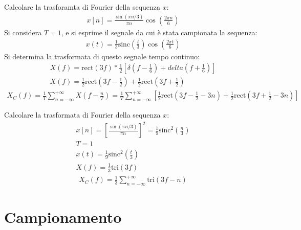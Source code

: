 \documentclass{article}
\begin{document}
Calcolare la trasforamta di Fourier della sequenza $x$:
\begin{gather*}
    x[n]=\displaystyle\frac{\sin(\pi n/3)}{\pi n}\cos\left(\frac{2\pi n}{6}\right)
\end{gather*}
Si considera $T=1$, e si esprime il segnale da cui è stata campionata la sequenza:
\begin{gather*}
    x(t)=\frac{1}{3}\mbox{sinc}\left(\frac{t}{3}\right)\cos\left(\frac{2\pi t}{6}\right)
\end{gather*}
Si determina la trasformata di questo segnale tempo continuo:
\begin{gather*}
    X(f)=\displaystyle\mbox{rect}(3f)*\frac{1}{2}\left[\delta\left(f-\frac{1}{6}\right)+delta\left(f+\frac{1}{6}\right)\right]\\
    X(f)=\displaystyle\frac{1}{2}\mbox{rect}\left(3f-\frac{1}{2}\right)+\frac{1}{2}\mbox{rect}\left(3f+\frac{1}{2}\right)
\end{gather*}
\begin{gather}
    X_C(f)=\displaystyle\frac{1}{T}\sum_{n=-\infty}^{+\infty}X\left(f-\frac{n}{T}\right)=\frac{1}{T}\sum_{n=-\infty}^{+\infty}\left[\frac{1}{2}\mbox{rect}\left(3f-\frac{1}{2}-3n\right)+\frac{1}{2}\mbox{rect}\left(3f+\frac{1}{2}-3n\right)\right]
\end{gather}



Calcolare la trasformata di Fourier della sequenza $x$:
\begin{gather*}
    x[n]=\left[\displaystyle\frac{\sin(\pi n/3)}{\pi n}\right]^2=\frac{1}{9}\mbox{sinc}^2\left(\frac{n}{3}\right)\\
    T=1\\
    x(t)=\displaystyle\frac{1}{9}\mbox{sinc}^2\left(\frac{t}{3}\right)\\
    X(f)=\displaystyle \frac{1}{3}\mbox{tri}(3f)
\end{gather*}
\begin{gather}
    X_C(f)=\displaystyle\frac{1}{3}\sum_{n=-\infty}^{+\infty}\mbox{tri}(3f-n)
\end{gather}

\clearpage

\section{Campionamento}
\end{document}
